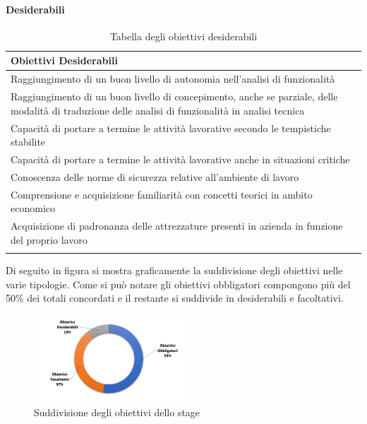 	\paragraph{Desiderabili}		

		\begin{center}
		  \bgroup
		  \def\arraystretch{1.4}
		   \setlength\arrayrulewidth{0.6pt}
		   \begin{longtable}{ | p{11cm} |} \hline
		   
		    \cellcolor[gray]{0.9} \textbf{Obiettivi Desiderabili} \\ \hline

			Raggiungimento di un buon livello di autonomia nell'analisi di funzionalità \\ \hline
			Raggiungimento di un buon livello di concepimento, anche se parziale, delle modalità di traduzione delle analisi di funzionalità in analisi tecnica \\ \hline
			Capacità di portare a termine le attività lavorative secondo le tempistiche stabilite \\ \hline
			Capacità di portare a termine le attività lavorative anche in situazioni critiche \\ \hline
			Conoscenza delle norme di sicurezza relative all'ambiente di lavoro \\ \hline
			Comprensione e acquisizione familiarità con concetti teorici in ambito economico \\ \hline
			Acquisizione di padronanza delle attrezzature presenti in azienda in funzione del proprio lavoro \\ \hline

			\caption{Tabella degli obiettivi desiderabili}
			
		    \end{longtable}
		  \egroup
		\end{center}

	Di seguito in figura si mostra graficamente la suddivisione degli obiettivi nelle varie tipologie. Come si può notare gli obiettivi obbligatori compongono più del 50\% dei totali concordati e il restante si suddivide in desiderabili e facoltativi.\\
	
	\begin{figure}[H]
		\centering
	   	\includegraphics[width=0.5\textwidth]{immagini/Percentuale_Obiettivi}
	   	\caption{Suddivisione degli obiettivi dello stage}
	\end{figure}

